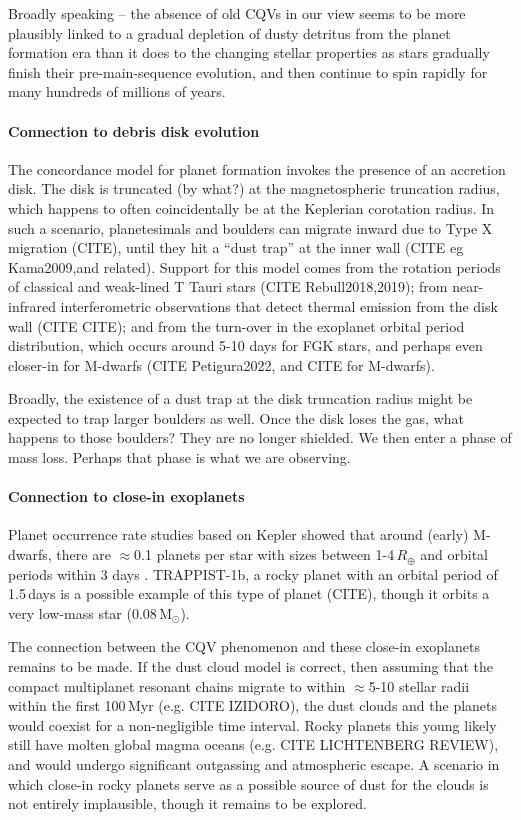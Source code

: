 \documentclass[11pt,twocolumn,tighten]{aastex63}
\begin{document}
Broadly speaking -- the absence of old CQVs in our view seems to be
more plausibly linked to a gradual depletion of dusty detritus from the
planet formation era than it does to the changing stellar properties
as stars gradually finish their pre-main-sequence evolution, and then
continue to spin rapidly for many hundreds of millions of years.



\paragraph{Connection to debris disk evolution}
The concordance model for planet formation invokes the presence of an accretion
disk.
The disk is truncated (by what?) at the magnetospheric truncation radius,
which happens to often coincidentally be at the Keplerian corotation radius.
In such a scenario, planetesimals and boulders can migrate inward due to
Type X migration (CITE),
until they hit a ``dust trap'' at the inner wall (CITE eg Kama2009,and
related).
Support for this model comes from the rotation periods of classical
and weak-lined T Tauri stars (CITE Rebull2018,2019);
from near-infrared interferometric observations that detect thermal
emission from the disk wall (CITE CITE);
and from the turn-over in the exoplanet orbital period distribution,
which occurs around 5-10 days for FGK stars, and perhaps even
closer-in for M-dwarfs (CITE Petigura2022, and CITE for M-dwarfs).

Broadly, the existence of a dust trap at the disk truncation radius 
might be expected to trap larger boulders as well.
Once the disk loses the gas, what happens to those boulders?
They are no longer shielded.
We then enter a phase of mass loss.
Perhaps that phase is what we are observing.


\paragraph{Connection to close-in exoplanets}
Planet occurrence rate studies based on Kepler showed that around
(early) M-dwarfs, there are $\approx$0.1 planets per star with sizes
between 1-4\,$R_\oplus$ and orbital periods within 3 days
\citep{2015ApJ...807...45D}.
TRAPPIST-1b, a rocky planet with an orbital period of 1.5\,days is a
possible example of this type of planet (CITE), though it orbits a
very low-mass star (0.08\,M$_\odot$).

The connection between the CQV phenomenon and these close-in
exoplanets remains to be made.
If the dust cloud model is correct, then assuming that the
compact multiplanet resonant chains migrate to within $\approx$5-10
stellar radii within the first 100\,Myr (e.g. CITE IZIDORO), the
dust clouds and the planets would coexist for a non-negligible time
interval.
Rocky planets this young likely still have molten global magma oceans
(e.g. CITE LICHTENBERG REVIEW), and would undergo significant 
outgassing and atmospheric escape.
A scenario in which close-in rocky planets serve as a possible source
of dust for the clouds is not entirely implausible, though it remains
to be explored.
\end{document}

